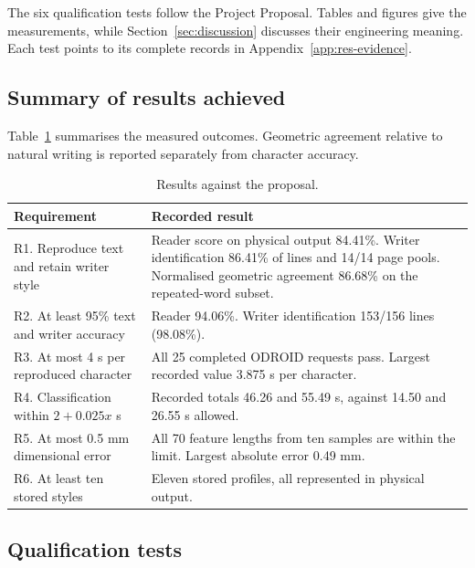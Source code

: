 \begingroup
\raggedbottom
\setlength{\textfloatsep}{12pt}
\setlength{\intextsep}{12pt}
\renewcommand{\resstep}[1]{\par\smallskip\noindent\QualificationSection{#1}\par\nobreak\smallskip}
\label{sec:results}
The six qualification tests follow the Project Proposal. Tables and figures give the measurements, while Section~\ref{sec:discussion} discusses their engineering meaning. Each test points to its complete records in Appendix~\ref{app:res-evidence}.

\subsection{Summary of results achieved}
\label{sec:res-summary}
Table~\ref{tab:res-summary} summarises the measured outcomes. Geometric agreement relative to natural writing is reported separately from character accuracy.
\begin{table}[H]\centering\small
\begin{tabularx}{\linewidth}{p{.25\linewidth}X}\toprule
Requirement & Recorded result\\\midrule
R1. Reproduce text and retain writer style & Reader score on physical output 84.41\%. Writer identification 86.41\% of lines and 14/14 page pools. Normalised geometric agreement 86.68\% on the repeated-word subset.\\[3pt]
R2. At least 95\% text and writer accuracy & Reader 94.06\%. Writer identification 153/156 lines (98.08\%).\\[3pt]
R3. At most 4 s per reproduced character & All 25 completed ODROID requests pass. Largest recorded value 3.875 s per character.\\[3pt]
R4. Classification within $2+0.025x$ s & Recorded totals 46.26 and 55.49 s, against 14.50 and 26.55 s allowed.\\[3pt]
R5. At most 0.5 mm dimensional error & All 70 feature lengths from ten samples are within the limit. Largest absolute error 0.49 mm.\\[3pt]
R6. At least ten stored styles & Eleven stored profiles, all represented in physical output.\\\bottomrule
\end{tabularx}
\caption{Results against the proposal.}\label{tab:res-summary}
\end{table}
\FloatBarrier

\subsection{Qualification tests}
\label{sec:res-qtp}
